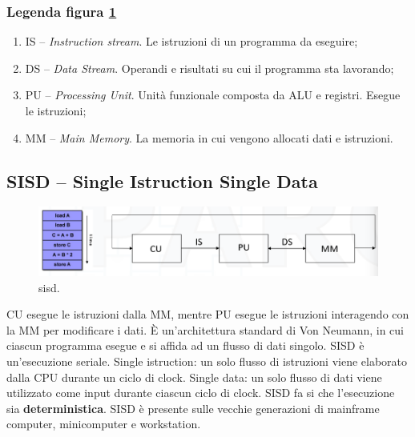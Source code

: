 \subsubsection*{Legenda figura \ref{fig:sisd}}
\begin{enumerate}
	\item IS -- \textit{Instruction stream}. Le istruzioni di un programma da eseguire;
	\item DS -- \textit{Data Stream}. Operandi e risultati su cui il programma sta lavorando;
	\item PU -- \textit{Processing Unit}. Unità funzionale composta da ALU e registri. Esegue le istruzioni;
	\item MM -- \textit{Main Memory}. La memoria in cui vengono allocati dati e istruzioni.
\end{enumerate}
\clearpage
\subsection*{SISD -- Single Istruction Single Data}
\begin{figure}[th]
	\centering
	\includegraphics[width=0.7\linewidth]{img/sisd}
	\caption{sisd.}
	\label{fig:sisd}
\end{figure}\noindent
CU esegue le istruzioni dalla MM, mentre PU esegue le istruzioni interagendo con la MM per modificare i dati. È un'architettura standard di Von Neumann, in cui ciascun programma esegue e si affida ad un flusso di dati singolo. SISD è un'esecuzione seriale. Single istruction: un solo flusso di istruzioni viene elaborato dalla CPU durante un ciclo di clock. Single data: un solo flusso di dati viene utilizzato come input durante ciascun ciclo di clock. SISD fa si che l'esecuzione sia \textbf{deterministica}. SISD è presente sulle vecchie generazioni di mainframe computer, minicomputer e workstation.

